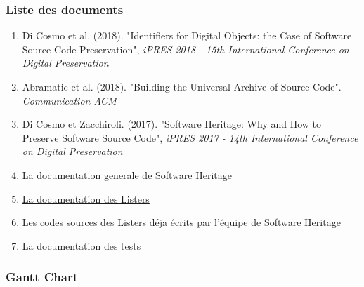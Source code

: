 \documentclass[12pt,a4paper]{report}
\begin{document}
\subsubsection{Liste des documents}
\begin{enumerate}
  \item Di Cosmo et al. (2018). "Identifiers for Digital Objects: the Case of Software Source Code Preservation", \textit{iPRES 2018 - 15th International Conference on Digital Preservation}
  \item Abramatic et al. (2018). "Building the Universal Archive of Source Code". \textit{Communication ACM}
  \item Di Cosmo et Zacchiroli. (2017). "Software Heritage: Why and How to Preserve Software Source Code", \textit{iPRES 2017 - 14th International Conference on Digital Preservation}
  \item \href{https://docs.softwareheritage.org/devel/}{La documentation generale de Software Heritage}
  \item \href{https://www.softwareheritage.org/2017/03/24/list-the-content-of-your-favorite-forge-in-just-a-few-steps/}{La documentation des Listers}
  \item \href{https://forge.softwareheritage.org/source/swh-lister/}{Les codes sources des Listers déja écrits par l'équipe de Software Heritage}
  \item \href{https://docs.softwareheritage.org/devel/getting-started.html#getting-started}{La documentation des tests}
\end{enumerate}

\newpage

\subsubsection{Gantt Chart}
\begin{figure}[!ht]
  \centering
  
\end{figure}
\end{document}
